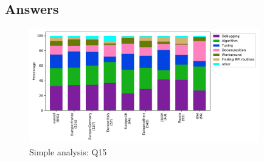 
\subsection{Answers}


\begin{figure}[htb]
\begin{center}
\includegraphics[width=10cm]{../pdfs/Q15.pdf}
\caption{Simple analysis: Q15}
\label{fig:Q15}
\end{center}
\end{figure}
